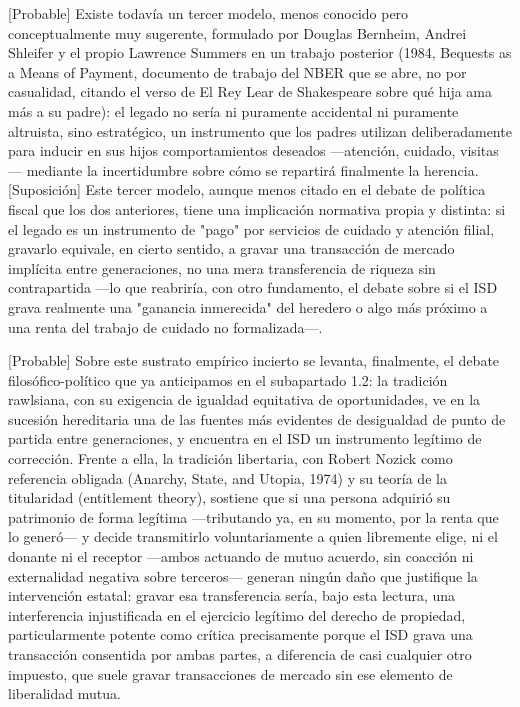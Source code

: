 \documentclass[10pt,a4paper]{article}
\begin{document}
[Probable] Existe todavía un tercer modelo, menos conocido pero conceptualmente muy sugerente, formulado por Douglas Bernheim, Andrei Shleifer y el propio Lawrence Summers en un trabajo posterior (1984, Bequests as a Means of Payment, documento de trabajo del NBER que se abre, no por casualidad, citando el verso de El Rey Lear de Shakespeare sobre qué hija ama más a su padre): el legado no sería ni puramente accidental ni puramente altruista, sino estratégico, un instrumento que los padres utilizan deliberadamente para inducir en sus hijos comportamientos deseados —atención, cuidado, visitas— mediante la incertidumbre sobre cómo se repartirá finalmente la herencia. [Suposición] Este tercer modelo, aunque menos citado en el debate de política fiscal que los dos anteriores, tiene una implicación normativa propia y distinta: si el legado es un instrumento de "pago" por servicios de cuidado y atención filial, gravarlo equivale, en cierto sentido, a gravar una transacción de mercado implícita entre generaciones, no una mera transferencia de riqueza sin contrapartida —lo que reabriría, con otro fundamento, el debate sobre si el ISD grava realmente una "ganancia inmerecida" del heredero o algo más próximo a una renta del trabajo de cuidado no formalizada—.

[Probable] Sobre este sustrato empírico incierto se levanta, finalmente, el debate filosófico-político que ya anticipamos en el subapartado 1.2: la tradición rawlsiana, con su exigencia de igualdad equitativa de oportunidades, ve en la sucesión hereditaria una de las fuentes más evidentes de desigualdad de punto de partida entre generaciones, y encuentra en el ISD un instrumento legítimo de corrección. Frente a ella, la tradición libertaria, con Robert Nozick como referencia obligada (Anarchy, State, and Utopia, 1974) y su teoría de la titularidad (entitlement theory), sostiene que si una persona adquirió su patrimonio de forma legítima —tributando ya, en su momento, por la renta que lo generó— y decide transmitirlo voluntariamente a quien libremente elige, ni el donante ni el receptor —ambos actuando de mutuo acuerdo, sin coacción ni externalidad negativa sobre terceros— generan ningún daño que justifique la intervención estatal: gravar esa transferencia sería, bajo esta lectura, una interferencia injustificada en el ejercicio legítimo del derecho de propiedad, particularmente potente como crítica precisamente porque el ISD grava una transacción consentida por ambas partes, a diferencia de casi cualquier otro impuesto, que suele gravar transacciones de mercado sin ese elemento de liberalidad mutua.
\end{document}
